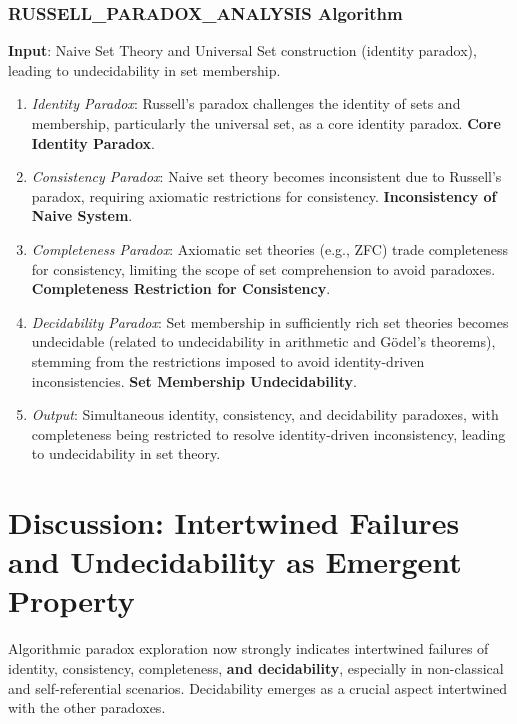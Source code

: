 \documentclass{article}
\begin{document}
	\subsubsection{RUSSELL\_PARADOX\_ANALYSIS Algorithm}
	\textbf{Input}: Naive Set Theory and Universal Set construction (identity paradox), leading to undecidability in set membership.
	\begin{enumerate}
		\item \textit{Identity Paradox}: Russell's paradox challenges the identity of sets and membership, particularly the universal set, as a core identity paradox. \textbf{Core Identity Paradox}.
		\item \textit{Consistency Paradox}: Naive set theory becomes inconsistent due to Russell's paradox, requiring axiomatic restrictions for consistency. \textbf{Inconsistency of Naive System}.
		\item \textit{Completeness Paradox}:  Axiomatic set theories (e.g., ZFC) trade completeness for consistency, limiting the scope of set comprehension to avoid paradoxes. \textbf{Completeness Restriction for Consistency}.
		\item \textit{Decidability Paradox}: Set membership in sufficiently rich set theories becomes undecidable (related to undecidability in arithmetic and Gödel's theorems), stemming from the restrictions imposed to avoid identity-driven inconsistencies. \textbf{Set Membership Undecidability}.
		\item \textit{Output}: Simultaneous identity, consistency, and decidability paradoxes, with completeness being restricted to resolve identity-driven inconsistency, leading to undecidability in set theory.
	\end{enumerate}
	
	
	\section{Discussion: Intertwined Failures and Undecidability as Emergent Property}
	
	Algorithmic paradox exploration now strongly indicates intertwined failures of identity, consistency, completeness, \textbf{and decidability}, especially in non-classical and self-referential scenarios.  Decidability emerges as a crucial aspect intertwined with the other paradoxes.
	
\end{document}
